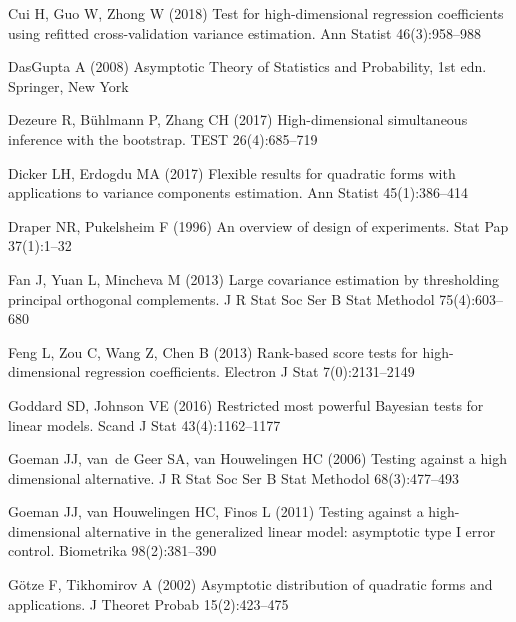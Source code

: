 \documentclass[smallextended]{svjour3}       %
\begin{document}
\begin{thebibliography}{}
Cui H, Guo W, Zhong W (2018) Test for high-dimensional regression coefficients using refitted cross-validation variance estimation. Ann Statist 46(3):958--988

DasGupta A (2008) Asymptotic Theory of Statistics and Probability, 1st edn.
  Springer, New York

Dezeure R, B\"uhlmann P, Zhang CH (2017) High-dimensional simultaneous
  inference with the bootstrap. {TEST} 26(4):685--719

Dicker LH, Erdogdu MA (2017) Flexible results for quadratic forms with
  applications to variance components estimation. Ann Statist
  45(1):386--414

    Draper NR, Pukelsheim F (1996) An overview of design of experiments. Stat Pap 37(1):1--32

Fan J, Yuan L, Mincheva M (2013) Large covariance estimation by thresholding
  principal orthogonal complements. J R Stat Soc Ser B Stat Methodol 75(4):603--680

Feng L, Zou C, Wang Z, Chen B (2013) Rank-based score tests for
  high-dimensional regression coefficients. Electron J Stat
  7(0):2131--2149

Goddard SD, Johnson VE (2016) Restricted most powerful Bayesian tests for
  linear models. Scand J Stat 43(4):1162--1177

Goeman JJ, van~de Geer SA, van Houwelingen HC (2006) Testing against a high
  dimensional alternative. J R Stat Soc Ser B Stat Methodol 68(3):477--493

Goeman JJ, van Houwelingen HC, Finos L (2011) Testing against a
  high-dimensional alternative in the generalized linear model: asymptotic type
  I error control. Biometrika 98(2):381--390

G\"otze F, Tikhomirov A (2002) Asymptotic distribution of quadratic forms and
  applications. J Theoret Probab 15(2):423--475


\end{thebibliography}
\end{document}
